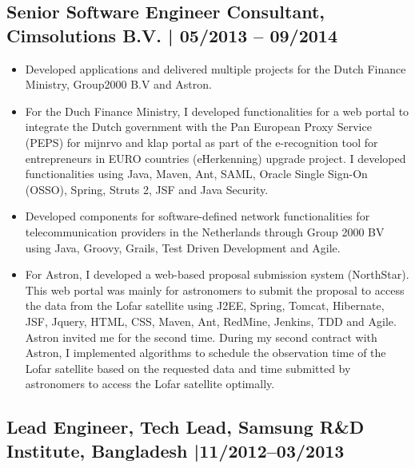 \documentclass[12pt,]{scrartcl}
\begin{document}
\subsection*{Senior Software Engineer Consultant, Cimsolutions B.V. | 05/2013 -- 09/2014}
\begin{itemize}

\item Developed applications and delivered multiple projects for the Dutch Finance Ministry, Group2000 B.V and Astron.
 
\item For the Duch Finance Ministry, I developed functionalities for a web portal to integrate the Dutch government with the Pan European Proxy Service (PEPS) for mijnrvo and klap portal as part of the e-recognition tool for entrepreneurs in EURO countries (eHerkenning) upgrade project. I developed functionalities using Java, Maven, Ant, SAML, Oracle Single Sign-On (OSSO), Spring, Struts 2, JSF and Java Security.

\item Developed components for software-defined network functionalities for telecommunication providers in the Netherlands through Group 2000 BV using Java, Groovy, Grails, Test Driven Development and Agile. 

 \item  For Astron, I developed a web-based proposal submission system (NorthStar). This web portal was mainly for astronomers to submit the proposal to access the data from the Lofar satellite using J2EE, Spring, Tomcat, Hibernate, JSF, Jquery, HTML, CSS, Maven, Ant, RedMine, Jenkins, TDD and Agile. Astron invited me for the second time. During my second contract with Astron, I implemented algorithms to schedule the observation time of the Lofar satellite based on the requested data and time submitted by astronomers to access the Lofar satellite optimally.

\end{itemize}


\subsection*{Lead Engineer, Tech Lead, Samsung R\&D Institute, Bangladesh |11/2012--03/2013 }
\end{document}
